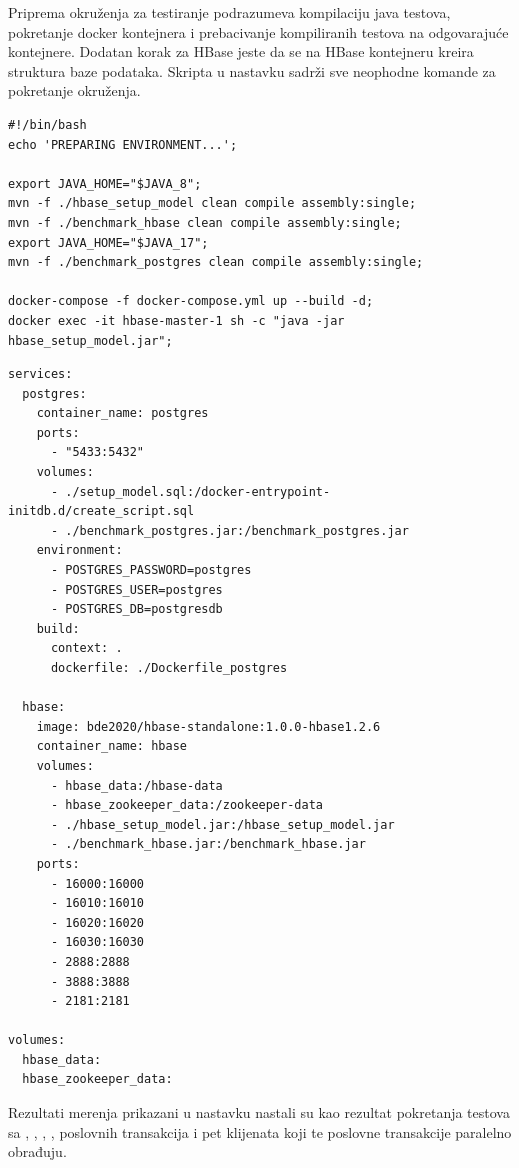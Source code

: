 \documentclass[12pt,oneside]{memoir}
\begin{document}
Priprema okruženja za testiranje podrazumeva kompilaciju java testova, pokretanje docker kontejnera i prebacivanje kompiliranih testova na odgovarajuće kontejnere. Dodatan korak za HBase jeste da se na HBase kontejneru kreira struktura baze podataka. Skripta u nastavku sadrži sve neophodne komande za pokretanje okruženja.

\pagebreak

\begin{lstlisting}[title={prepare-env.sh - Skripta za pokretanje OLTP okruženja},captionpos=b]
#!/bin/bash
echo 'PREPARING ENVIRONMENT...';

export JAVA_HOME="$JAVA_8";
mvn -f ./hbase_setup_model clean compile assembly:single;
mvn -f ./benchmark_hbase clean compile assembly:single;
export JAVA_HOME="$JAVA_17";
mvn -f ./benchmark_postgres clean compile assembly:single;

docker-compose -f docker-compose.yml up --build -d;
docker exec -it hbase-master-1 sh -c "java -jar hbase_setup_model.jar";
\end{lstlisting}

\begin{lstlisting}[title={docker-compose.yml - Definicija kontejnera za OLTP okruženje},captionpos=b]
services: 
  postgres:
    container_name: postgres
    ports:
      - "5433:5432"
    volumes:
      - ./setup_model.sql:/docker-entrypoint-initdb.d/create_script.sql
      - ./benchmark_postgres.jar:/benchmark_postgres.jar
    environment:
      - POSTGRES_PASSWORD=postgres
      - POSTGRES_USER=postgres
      - POSTGRES_DB=postgresdb
    build:
      context: .
      dockerfile: ./Dockerfile_postgres

  hbase:
    image: bde2020/hbase-standalone:1.0.0-hbase1.2.6
    container_name: hbase
    volumes:
      - hbase_data:/hbase-data
      - hbase_zookeeper_data:/zookeeper-data
      - ./hbase_setup_model.jar:/hbase_setup_model.jar
      - ./benchmark_hbase.jar:/benchmark_hbase.jar
    ports:
      - 16000:16000
      - 16010:16010
      - 16020:16020
      - 16030:16030
      - 2888:2888
      - 3888:3888
      - 2181:2181

volumes:
  hbase_data:
  hbase_zookeeper_data:
\end{lstlisting}

Rezultati merenja prikazani u nastavku nastali su kao rezultat pokretanja testova sa , , , ,  poslovnih transakcija i pet klijenata koji te poslovne transakcije paralelno obrađuju.
\end{document}

